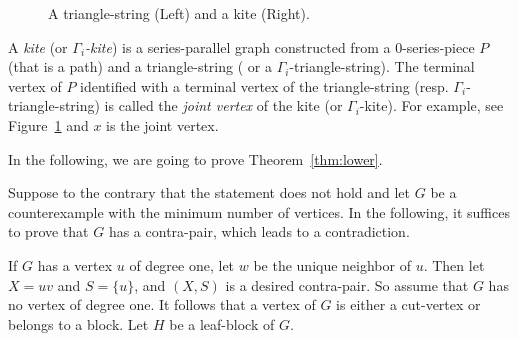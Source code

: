 \documentclass{article}
\begin{document}
\begin{figure}[!htb]
\begin{center}
\caption{A triangle-string (Left) and a kite (Right).}\label{fig2}
\end{center}
\end{figure}   



A {\em kite}  (or {\em $\Gamma_i$-kite}) is a series-parallel graph constructed from a $0$-series-piece $P$ (that is a path) and a  triangle-string ( or a  $\Gamma_i$-triangle-string). The terminal vertex of $P$ identified with a terminal vertex of the triangle-string (resp. $\Gamma_i$-triangle-string) is called the {\em joint vertex} of the kite (or $\Gamma_i$-kite). For example, see Figure~\ref{fig2} and $x$ is the joint vertex. 
  
In the following, we are going to prove Theorem~\ref{thm:lower}. 
 

\medskip
{} 
    Suppose to the contrary that the statement does not hold and let $G$ be a counterexample with the minimum number of vertices. In the following, it suffices to prove that $G$ has a contra-pair, which leads to a contradiction.
     

If $G$ has a vertex $u$ of degree one, let $w$ be the unique neighbor of $u$. Then let $X=uv$ and $S=\{u\}$, and $(X, S)$ is a desired contra-pair.
 So assume that $G$ has no vertex of degree one. It follows that a vertex of $G$ is either a cut-vertex or belongs to a block. Let $H$ be a leaf-block of $G$. 
\end{document}
